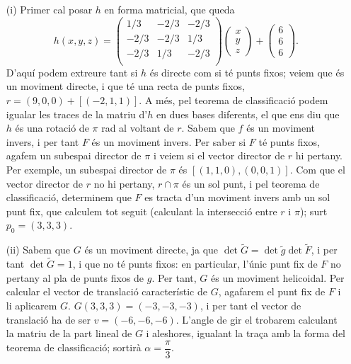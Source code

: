 \documentclass[10pt]{article}
\begin{document}
\begin{itemize}
	\item[(i)] Primer cal posar $h$ en forma matricial, que queda
	\[
	h(x,y,z)=\begin{pmatrix}
	1/3 & -2/3 & -2/3\\
	-2/3 & -2/3 & 1/3\\
	-2/3 & 1/3 & -2/3\\
	\end{pmatrix}
	\begin{pmatrix}
	x\\ y\\ z
	\end{pmatrix}
	+\begin{pmatrix}
	6\\ 6\\ 6
	\end{pmatrix}.
	\]
	D'aquí podem extreure tant si $h$ és directe com si té punts fixos; veiem que és un moviment directe, i que té una recta de punts fixos, $r=(9,0,0)+[(-2,1,1)]$. A més, pel teorema de classificació podem igualar les traces de la matriu d'$h$ en dues bases diferents, el que ens diu que $h$ és una rotació de $\pi$ rad al voltant de $r$. Sabem que $f$ és un moviment invers, i per tant $F$ és un moviment invers. Per saber si $F$ té punts fixos, agafem un subespai director de $\pi$ i veiem si el vector director de $r$ hi pertany. Per exemple, un subespai director de $\pi$ és $[(1,1,0),(0,0,1)]$. Com que el vector director de $r$ no hi pertany, $r\cap\pi$ és un sol punt, i pel teorema de classificació, determinem que $F$ es tracta d'un moviment invers amb un sol punt fix, que calculem tot seguit (calculant la intersecció entre $r$ i $\pi$); surt $p_0=(3,3,3)$.
	\item[(ii)] Sabem que $G$ és un moviment directe, ja que $\det{\tilde{G}}=\det{\tilde{g}}\det{\tilde{F}}$, i per tant $\det{\tilde{G}}=1$, i que no té punts fixos: en particular, l'únic punt fix de $F$ no pertany al pla de punts fixos de $g$. Per tant, $G$ és un moviment helicoidal. Per calcular el vector de translació característic de $G$, agafarem el punt fix de $F$ i li aplicarem $G$. $G(3,3,3)=(-3,-3,-3)$, i per tant el vector de translació ha de ser $v=(-6,-6,-6)$. L'angle de gir el trobarem calculant la matriu de la part lineal de $G$ i aleshores, igualant la traça amb la forma del teorema de classificació; sortirà $\alpha=\dfrac{\pi}{3}$.
\end{itemize}
\end{document}
